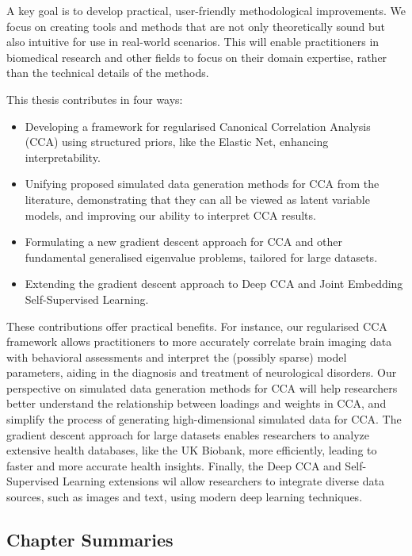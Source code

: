 A key goal is to develop practical, user-friendly methodological improvements.
We focus on creating tools and methods that are not only theoretically sound but also intuitive for use in real-world scenarios.
This will enable practitioners in biomedical research and other fields to focus on their domain expertise, rather than the technical details of the methods.

This thesis contributes in four ways:

\begin{itemize}
    \item Developing a framework for regularised Canonical Correlation Analysis (CCA) using structured priors, like the Elastic Net, enhancing interpretability.
    \item Unifying proposed simulated data generation methods for CCA from the literature, demonstrating that they can all be viewed as latent variable models, and improving our ability to interpret CCA results.
    \item Formulating a new gradient descent approach for CCA and other fundamental generalised eigenvalue problems, tailored for large datasets.
    \item Extending the gradient descent approach to Deep CCA and Joint Embedding Self-Supervised Learning.
\end{itemize}

These contributions offer practical benefits.
For instance, our regularised CCA framework allows practitioners to more accurately correlate brain imaging data with behavioral assessments and interpret the (possibly sparse) model parameters, aiding in the diagnosis and treatment of neurological disorders.
Our perspective on simulated data generation methods for CCA will help researchers better understand the relationship between loadings and weights in CCA, and simplify the process of generating high-dimensional simulated data for CCA.
The gradient descent approach for large datasets enables researchers to analyze extensive health databases, like the UK Biobank, more efficiently, leading to faster and more accurate health insights.
Finally, the Deep CCA and Self-Supervised Learning extensions wil allow researchers to integrate diverse data sources, such as images and text, using modern deep learning techniques.

\subsection{Chapter Summaries}

